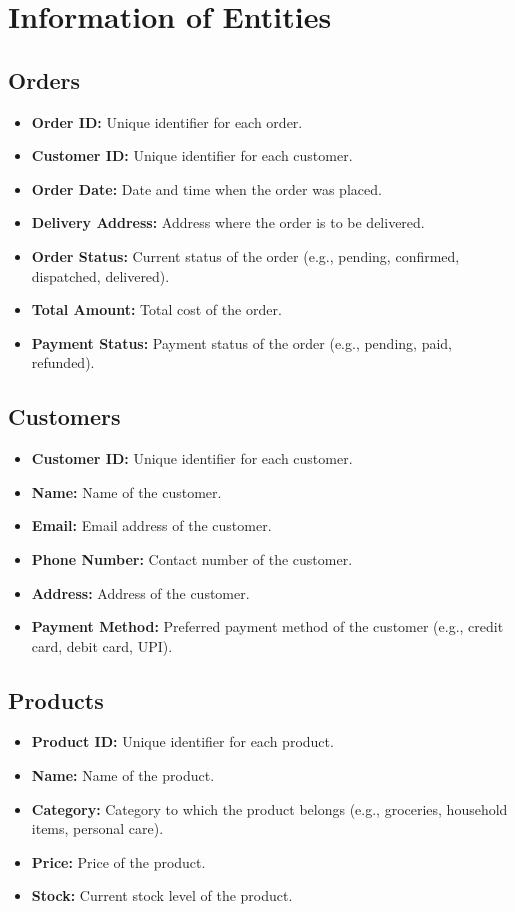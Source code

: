 \documentclass{article}
\begin{document}
\section{Information of Entities}
\subsection{Orders}
\begin{itemize}
    \item \textbf{Order ID:} Unique identifier for each order.
    \item \textbf{Customer ID:} Unique identifier for each customer.
    \item \textbf{Order Date:} Date and time when the order was placed.
    \item \textbf{Delivery Address:} Address where the order is to be delivered.
    \item \textbf{Order Status:} Current status of the order (e.g., pending, confirmed, dispatched, delivered).
    \item \textbf{Total Amount:} Total cost of the order.
    \item \textbf{Payment Status:} Payment status of the order (e.g., pending, paid, refunded).
\end{itemize}

\subsection{Customers}
\begin{itemize}
    \item \textbf{Customer ID:} Unique identifier for each customer.
    \item \textbf{Name:} Name of the customer.
    \item \textbf{Email:} Email address of the customer.
    \item \textbf{Phone Number:} Contact number of the customer.
    \item \textbf{Address:} Address of the customer.
    \item \textbf{Payment Method:} Preferred payment method of the customer (e.g., credit card, debit card, UPI).
\end{itemize}

\subsection{Products}
\begin{itemize}
    \item \textbf{Product ID:} Unique identifier for each product.
    \item \textbf{Name:} Name of the product.
    \item \textbf{Category:} Category to which the product belongs (e.g., groceries, household items, personal care).
    \item \textbf{Price:} Price of the product.
    \item \textbf{Stock:} Current stock level of the product.
\end{itemize}
\end{document}
